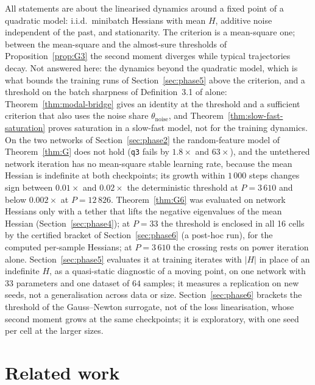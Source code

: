 \documentclass[11pt]{article}
\theoremstyle{remark}
\begin{document}
All statements are about the linearised dynamics around a fixed point of a quadratic model: i.i.d.\ minibatch Hessians with mean $H$, additive noise independent of the past, and stationarity. The criterion is a mean-square one; between the mean-square and the almost-sure thresholds of Proposition~\ref{prop:G3} the second moment diverges while typical trajectories decay. Not answered here: the dynamics beyond the quadratic model, which is what bounds the training runs of Section~\ref{sec:phase5} above the criterion, and a threshold on the batch sharpness of Definition~3.1 of \citet{andreyev2026momentum} alone: Theorem~\ref{thm:modal-bridge} gives an identity at the threshold and a sufficient criterion that also uses the noise share $\theta_{\mathrm{noise}}$, and Theorem~\ref{thm:slow-fast-saturation} proves saturation in a slow-fast model, not for the training dynamics. On the two networks of Section~\ref{sec:phase2} the random-feature model of Theorem~\ref{thm:G} does not hold (\texttt{q3} fails by $1.8\times$ and $63\times$), and the untethered network iteration has no mean-square stable learning rate, because the mean Hessian is indefinite at both checkpoints; its growth within $1\,000$ steps changes sign between $0.01\times$ and $0.02\times$ the deterministic threshold at $P=3\,610$ and below $0.002\times$ at $P=12\,826$. Theorem~\ref{thm:G6} was evaluated on network Hessians only with a tether that lifts the negative eigenvalues of the mean Hessian (Section~\ref{sec:phase4}); at $P=33$ the threshold is enclosed in all 16 cells by the certified bracket of Section~\ref{sec:phase6} (a post-hoc run), for the computed per-sample Hessians; at $P=3\,610$ the crossing rests on power iteration alone. Section~\ref{sec:phase5} evaluates it at training iterates with $|H|$ in place of an indefinite $H$, as a quasi-static diagnostic of a moving point, on one network with $33$ parameters and one dataset of $64$ samples; it measures a replication on new seeds, not a generalisation across data or size. Section~\ref{sec:phase6} brackets the threshold of the Gauss--Newton surrogate, not of the loss linearisation, whose second moment grows at the same checkpoints; it is exploratory, with one seed per cell at the larger sizes.

\section{Related work}
\end{document}

